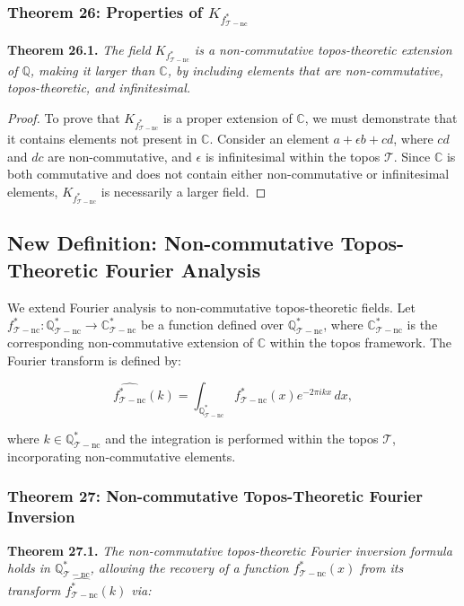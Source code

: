 \documentclass{article}
\begin{document}
\subsubsection{Theorem 26: Properties of \(K_{f_{\mathcal{T}-\text{nc}}^*}\)}
\textbf{Theorem 26.1.} \textit{The field \(K_{f_{\mathcal{T}-\text{nc}}^*}\) is a non-commutative topos-theoretic extension of \(\mathbb{Q}\), making it larger than \(\mathbb{C}\), by including elements that are non-commutative, topos-theoretic, and infinitesimal.}

\begin{proof}
To prove that \(K_{f_{\mathcal{T}-\text{nc}}^*}\) is a proper extension of \(\mathbb{C}\), we must demonstrate that it contains elements not present in \(\mathbb{C}\). Consider an element \(a + \epsilon b + cd\), where \(cd\) and \(dc\) are non-commutative, and \(\epsilon\) is infinitesimal within the topos \(\mathcal{T}\). Since \(\mathbb{C}\) is both commutative and does not contain either non-commutative or infinitesimal elements, \(K_{f_{\mathcal{T}-\text{nc}}^*}\) is necessarily a larger field.
\end{proof}

\subsection{New Definition: Non-commutative Topos-Theoretic Fourier Analysis}
We extend Fourier analysis to non-commutative topos-theoretic fields. Let \(f_{\mathcal{T}-\text{nc}}^*: \mathbb{Q}_{\mathcal{T}-\text{nc}}^* \to \mathbb{C}_{\mathcal{T}-\text{nc}}^*\) be a function defined over \(\mathbb{Q}_{\mathcal{T}-\text{nc}}^*\), where \(\mathbb{C}_{\mathcal{T}-\text{nc}}^*\) is the corresponding non-commutative extension of \(\mathbb{C}\) within the topos framework. The Fourier transform is defined by:

\[
\widehat{f_{\mathcal{T}-\text{nc}}^*}(k) = \int_{\mathbb{Q}_{\mathcal{T}-\text{nc}}^*} f_{\mathcal{T}-\text{nc}}^*(x) e^{-2\pi i k x} \, dx,
\]

where \(k \in \mathbb{Q}_{\mathcal{T}-\text{nc}}^*\) and the integration is performed within the topos \(\mathcal{T}\), incorporating non-commutative elements.

\subsubsection{Theorem 27: Non-commutative Topos-Theoretic Fourier Inversion}
\textbf{Theorem 27.1.} \textit{The non-commutative topos-theoretic Fourier inversion formula holds in \(\mathbb{Q}_{\mathcal{T}-\text{nc}}^*\), allowing the recovery of a function \(f_{\mathcal{T}-\text{nc}}^*(x)\) from its transform \(\widehat{f_{\mathcal{T}-\text{nc}}^*}(k)\) via:}
\end{document}
